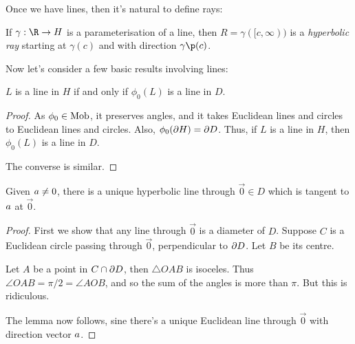 Once we have lines, then it's natural to define rays:

\begin{definition}
	If $\gamma:\R\to H$ is a parameterisation of a line, then $R=\gamma([c,\infty))$ is a \emph{hyperbolic ray} starting at $\gamma(c)$ and with direction $\gamma\p(c)$.
\end{definition}

Now let's consider a few basic results involving lines:

\begin{lemma}
	$L$ is a line in $H$ if and only if $\phi_0(L)$ is a line in $D$.
\end{lemma}

\begin{proof}
	As $\phi_0\in\operatorname{Mob}$, it preserves angles, and it takes Euclidean lines and circles to Euclidean lines and circles. Also, $\phi_0(\partial{H}) = \partial{D}$. Thus, if $L$ is a line in $H$, then $\phi_0(L)$ is a line in $D$.

	The converse is similar.
\end{proof}

\begin{lemma}
	Given $a \neq 0$, there is a unique hyperbolic line through $\vec{0} \in D$ which is tangent to $a$ at $\vec{0}$.
\end{lemma}

\begin{proof}
	First we show that any line through $\vec{0}$ is a diameter of $D$. Suppose $C$ is a Euclidean circle passing through $\vec{0}$, perpendicular to $\partial{D}$. Let $B$ be its centre.



	Let $A$ be a point in $C \cap \partial{D}$, then $\triangle OAB$ is isoceles. Thus $\angle OAB = \pi/2 = \angle AOB$, and so the sum of the angles is more than $\pi$. But this is ridiculous.

	The lemma now follows, sine there's a unique Euclidean line through $\vec{0}$ with direction vector $a$.
\end{proof}

